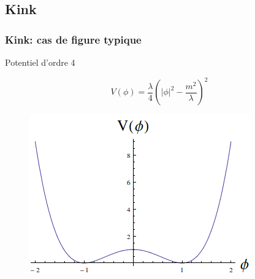 \documentclass[handout]{beamer}
\begin{document}
\subsection{Kink}
\begin{frame}
\frametitle{Kink: cas de figure typique}
\begin{block}{Potentiel d'ordre 4}

    \begin{equation*}
    V(\phi) = \frac{\lambda}{4}(|\phi|^2 -\frac{m^2}{\lambda})^2
    \end{equation*}
    \begin{figure}
     \includegraphics[scale=0.5]{pot_z2.png}
    \end{figure}


\end{block}
\end{frame}
\end{document}
